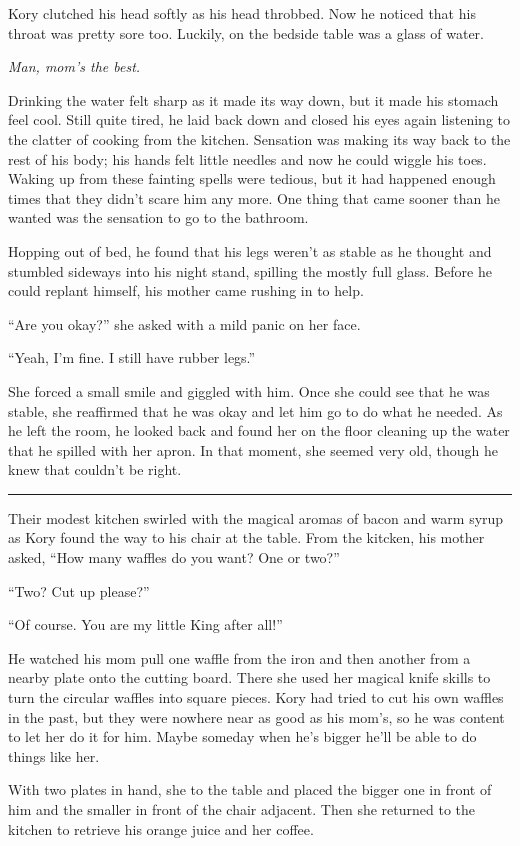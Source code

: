\documentclass[9pt]{memoir}
\renewcommand{\line}{\noindent\rule{\textwidth}{1pt}\vspace{1em}}
\begin{document}
Kory clutched his head softly as his head throbbed. Now he noticed that his throat was pretty sore too. Luckily, on the bedside table was a glass of water.

\textit{Man, mom's the best.}

Drinking the water felt sharp as it made its way down, but it made his stomach feel cool. Still quite tired, he laid back down and closed his eyes again listening to the clatter of cooking from the kitchen. Sensation was making its way back to the rest of his body; his hands felt little needles and now he could wiggle his toes. Waking up from these fainting spells were tedious, but it had happened enough times that they didn't scare him any more. One thing that came sooner than he wanted was the sensation to go to the bathroom.

Hopping out of bed, he found that his legs weren't as stable as he thought and stumbled sideways into his night stand, spilling the mostly full glass. Before he could replant himself, his mother came rushing in to help.

``Are you okay?'' she asked with a mild panic on her face.

``Yeah, I'm fine. I still have rubber legs.''

She forced a small smile and giggled with him. Once she could see that he was stable, she reaffirmed that he was okay and let him go to do what he needed. As he left the room, he looked back and found her on the floor cleaning up the water that he spilled with her apron. In that moment, she seemed very old, though he knew that couldn't be right.

\line

Their modest kitchen swirled with the magical aromas of bacon and warm syrup as Kory found the way to his chair at the table. From the kitcken, his mother asked, ``How many waffles do you want? One or two?''

``Two? Cut up please?''

``Of course. You are my little King after all!''

He watched his mom pull one waffle from the iron and then another from a nearby plate onto the cutting board. There she used her magical knife skills to turn the circular waffles into square pieces. Kory had tried to cut his own waffles in the past, but they were nowhere near as good as his mom's, so he was content to let her do it for him. Maybe someday when he's bigger he'll be able to do things like her.

With two plates in hand, she  to the table and placed the bigger one in front of him and the smaller in front of the chair adjacent. Then she returned to the kitchen to retrieve his orange juice and her coffee.
\end{document}
